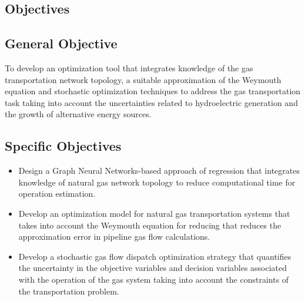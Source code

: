 \subsection{Objectives}

\subsection{General Objective}
To develop an optimization tool that integrates knowledge of the gas transportation network topology, a suitable approximation of the Weymouth equation and stochastic optimization techniques to address the gas transportation task taking into account the uncertainties related to hydroelectric generation and the growth of alternative energy sources.

\subsection{Specific Objectives}
\begin{itemize}

\item Design a Graph Neural Networks-based approach of regression that integrates knowledge of natural gas network topology to reduce computational time for operation estimation.

\item Develop an optimization model for natural gas transportation systems that takes into account the Weymouth equation for reducing that reduces the approximation error in pipeline gas flow calculations.

\item Develop a stochastic gas flow dispatch optimization strategy that quantifies the uncertainty in the objective variables and decision variables associated with the operation of the gas system taking into account the constraints of the transportation problem.

\end{itemize}












